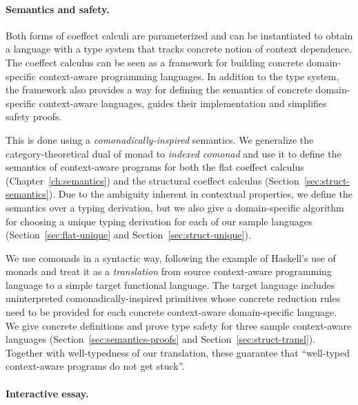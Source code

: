 
\paragraph{Semantics and safety.}

Both forms of coeffect calculi are parameterized and can be instantiated to obtain a language with
a type system that tracks concrete notion of context dependence. The coeffect calculus can be seen
as a framework for building concrete domain-specific context-aware programming languages. In
addition to the type system, the framework also provides a way for defining the semantics of
concrete domain-specific context-aware languages, guides their implementation and simplifies
safety proofs.

This is done using a \emph{comonadically-inspired} semantics. We generalize the category-theoretical
dual of monad to \emph{indexed comonad} and use it to define the semantics of context-aware
programs for both the flat coeffect calculus (Chapter~\ref{ch:semantics}) and the structural coeffect
calculus (Section~\ref{sec:struct-semantics}). Due to the ambiguity inherent in contextual properties,
we define the semantics over a typing derivation, but we also give a domain-specific algorithm for
choosing a unique typing derivation for each of our sample languages (Section~\ref{sec:flat-unique}
and Section~\ref{sec:struct-unique}).

We use comonads in a syntactic way, following the example of Haskell's use of monads and treat
it as a \emph{translation} from source context-aware programming language to a simple target
functional language. The target language includes uninterpreted comonadically-inspired primitives
whose concrete reduction rules need to be provided for each concrete context-aware domain-specific
language. We give concrete definitions and prove type safety for three sample context-aware
languages (Section~\ref{sec:semantics-proofs} and Section~\ref{sec:struct-transl}). Together with
well-typedness of our translation, these guarantee that ``well-typed context-aware programs do
not get stuck''.


\paragraph{Interactive essay.}

